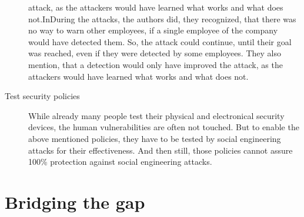 \begin{description}
  attack, as the attackers would have learned what works and what does
  not.InDuring the attacks, the authors did, they recognized, that there was
  no way to warn other employees, if a single employee of the company would
  have detected them. So, the attack could continue, until their goal was
  reached, even if they were detected by some employees. They also mention,
  that a detection would only have improved the attack, as the attackers would
  have learned what works and what does not.
  \item[Test security policies] While already many people test their physical
  and electronical security devices, the human vulnerabilities are often not
  touched. But to enable the above mentioned policies, they have to be tested
  by social engineering attacks for their effectiveness. And then still, those
  policies cannot assure 100\% protection against social engineering attacks.
\end{description}

\section{Bridging the gap}
